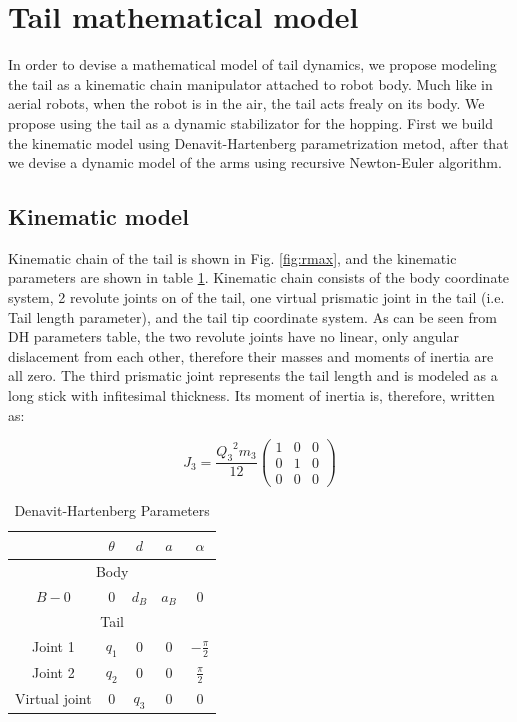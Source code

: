 \section{Tail mathematical model}
In order to devise a mathematical model of tail dynamics, we propose modeling the tail as a kinematic chain manipulator attached to robot body. Much like in aerial robots, when the robot is in the air, the tail acts frealy on its body. We propose using the tail as a dynamic stabilizator for the hopping. First we build the kinematic model using Denavit-Hartenberg parametrization metod, after that we devise a dynamic model of the arms using recursive Newton-Euler algorithm.

\subsection{Kinematic model}
Kinematic chain of the tail is shown in Fig. \ref{fig:rmax}, and the kinematic parameters are shown in table \ref{tab:DHParameters}. Kinematic chain consists of the body coordinate system, 2 revolute joints on of the tail, one virtual prismatic joint in the tail (i.e. Tail length parameter), and the tail tip coordinate system. As can be seen from DH parameters table, the two revolute joints have no linear, only angular dislacement from each other, therefore their masses and moments of inertia are all zero. The third prismatic joint represents the tail length and is modeled as a long stick with infitesimal thickness. Its moment of inertia is, therefore, written as:

\begin{equation}
J_3=\frac{{Q_3}^2 m_3}{12}\left(
\begin{array}{ccc}
 1 & 0 & 0 \\
 0 & 1 & 0 \\
 0 & 0 & 0
\end{array}
\right)
\end{equation} 

\begin{table}
	\centering
		\begin{tabular}{ccccc}
		\hline
			& $\theta$ & $d$ & $a$ & $\alpha$ \\\hline
			\multicolumn{5}{c}{Body}\\\hline
			$B-0$ & $0$ & $d_B$ & $a_B$ & $0$\\\hline
			\multicolumn{5}{c}{Tail}\\\hline
			Joint 1 & $q_1$ & $0$ & $0$ & $-\frac{\pi}{2}$\\
			Joint 2 & $q_2$ & $0$ & $0$ & $\frac{\pi}{2}$\\
			Virtual joint& $0$ & $q_3$ & $0$ & $0$\\\hline
		\end{tabular}
	\caption{Denavit-Hartenberg Parameters}\label{tab:DHParameters}
\end{table}

